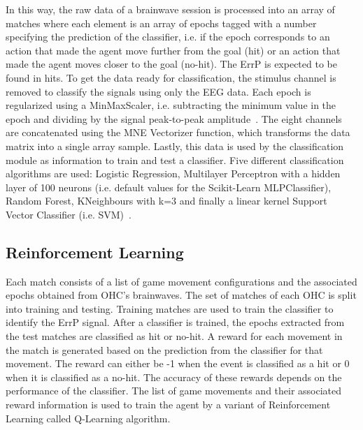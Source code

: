 \documentclass[journal]{IEEEtran}
\begin{document}
{In this way, the raw data of a brainwave session is processed into an array of matches where each element is an array of epochs tagged with a number specifying the prediction of the classifier, i.e. if the epoch corresponds to an action that made the agent move further from the goal (hit) or an action that made the agent moves closer to the goal (no-hit). The ErrP is expected to be found in hits. To get the data ready for classification, the stimulus channel is removed to classify the signals using only the EEG data. Each epoch is regularized using a MinMaxScaler, i.e. subtracting the minimum value in the epoch and dividing by the signal peak-to-peak amplitude~\cite{Zhou2019}.  The eight channels are concatenated using the MNE Vectorizer function, which transforms the data matrix into a single array sample. Lastly, this data is used by the classification module as information to train and test a classifier. Five different classification algorithms are used:  Logistic Regression, Multilayer Perceptron with a hidden layer of 100 neurons (i.e. default values for the Scikit-Learn MLPClassifier), Random Forest, KNeighbours with k=3 and finally a linear kernel Support Vector Classifier (i.e. SVM)~\cite{Lotte2018}.




\subsection{Reinforcement Learning}
\label{learning}

Each match consists of a list of game movement configurations and the associated epochs obtained from OHC's brainwaves.  The set of matches of each OHC is split into training and testing.  Training matches are used to train the classifier to identify the ErrP signal.  After a classifier is trained, the epochs extracted from the test matches are classified as hit or no-hit.  A reward for each movement in the match is generated based on the prediction from the classifier for that movement.  The reward can either be -1 when the event is classified as a hit or 0 when it is classified as a no-hit. The accuracy of these rewards depends on the performance of the classifier. The list of game movements and their associated reward information is used to train the agent by a variant of Reinforcement Learning called Q-Learning algorithm.

}
\end{document}
